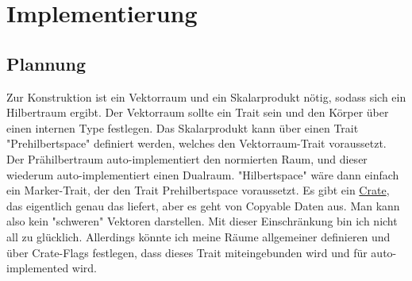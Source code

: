 \documentclass[12pt]{article}
\begin{document}
\section{Implementierung}
\subsection{Plannung}
Zur Konstruktion ist ein Vektorraum und ein Skalarprodukt nötig, sodass sich ein Hilbertraum ergibt. Der Vektorraum sollte ein Trait sein und den Körper über einen internen Type festlegen. Das Skalarprodukt kann über einen Trait "Prehilbertspace" definiert werden, welches den Vektorraum-Trait voraussetzt. Der Prähilbertraum auto-implementiert den normierten Raum, und dieser wiederum auto-implementiert einen Dualraum. "Hilbertspace" wäre dann einfach ein Marker-Trait, der den Trait Prehilbertspace voraussetzt. Es gibt ein \href{https://docs.rs/vector-space/latest/vector_space/index.html}{Crate}, das eigentlich genau das liefert, aber es geht von Copyable Daten aus. Man kann also kein "schweren" Vektoren darstellen. Mit dieser Einschränkung bin ich nicht all zu glücklich. Allerdings könnte ich meine Räume allgemeiner definieren und über Crate-Flags festlegen, dass dieses Trait miteingebunden wird und für auto-implemented wird.



\end{document}
